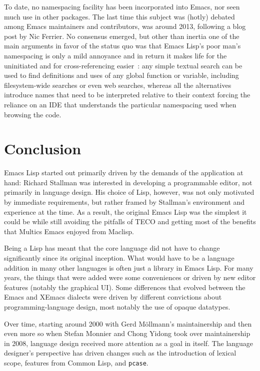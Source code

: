 \documentclass[format=acmsmall, review]{acmart}
\newcommand \Elisp {Emacs Lisp}
\begin{document}
To date, no namespacing facility has been incorporated into Emacs, nor seen
much use in other packages.  The last time this subject was (hotly) debated
among Emacs maintainers and contributors, was around 2013, following a blog
post by Nic Ferrier.
No consensus emerged, but other than inertia one of the
main arguments in favor of the status quo was that \Elisp's poor man's
namespacing is only a mild annoyance and in return it makes life for the
uninitiated and for cross-referencing easier~\cite{namespace-discussion}:
any simple textual
search can be
used to find definitions and uses of any global function or variable,
including filesystem-wide searches or even web searches,
whereas all the alternatives introduce names that need to be interpreted
relative to their context forcing the reliance on an IDE that understands the
particular namespacing used when browsing the code.


\section{Conclusion}
\label{sec:conclusion}


\Elisp{} started out primarily driven by the demands of the
application at hand: Richard Stallman was interested in developing a
programmable editor, not primarily in language design.  His choice of
Lisp, however, was not only motivated by immediate requirements, but
rather framed by Stallman's environment and experience at the time.  As
a result, the original \Elisp{} was the simplest it could be while
still avoiding the pitfalls of TECO and getting most of the benefits that
Multics Emacs enjoyed from Maclisp.

Being a Lisp has meant that the core language did not have to change
significantly since its original inception.  What would have to be a
language addition in many other languages is often just a library in \Elisp{}.
For many years, the
things that were added were some conveniences or driven by new editor
features (notably the graphical UI).  Some differences that evolved
between the Emacs and XEmacs dialects were driven by different
convictions about programming-language design, most notably the use of
opaque datatypes.

Over time, starting around 2000 with Gerd Möllmann's maintainership and then
even more so when Stefan Monnier and Chong Yidong took over maintainership
in 2008, language design received more attention as a goal in itself.
The language designer's perspective has driven changes such as the
introduction of lexical scope, features from Common Lisp, and
\texttt{pcase}.
\end{document}
